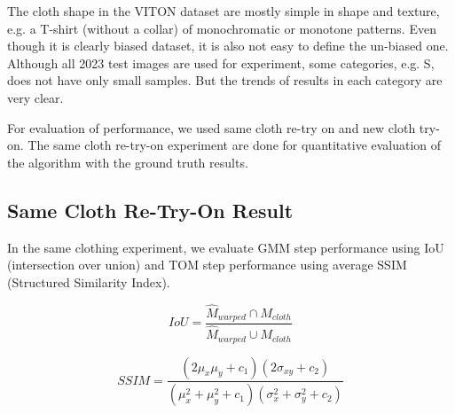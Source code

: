 The cloth shape in the VITON dataset are mostly simple in shape and texture, e.g. a T-shirt (without a collar) of  monochromatic or monotone patterns. Even though it is clearly biased dataset, it is also not easy to define the un-biased one. Although all 2023 test images are used for experiment, some categories, e.g. S, does not have only small samples. But the trends of results in each category are very clear. 


For evaluation of performance, we used same cloth re-try on and new cloth try-on. 
The same cloth re-try-on experiment are done for quantitative evaluation of the algorithm with the ground truth results. 

\subsection{Same Cloth Re-Try-On Result} 

In the same clothing experiment, we evaluate GMM step performance using IoU (intersection over union) and TOM step performance using average SSIM (Structured Similarity Index).

\begin{equation}
 IoU = \frac{ \hat{M}_{warped} \cap M_{cloth}}
            { \hat{M}_{warped} \cup M_{cloth}}
\end{equation} 


\begin{equation}
 SSIM = \frac{ ( 2 \mu_x \mu_y + c_1 )(2 \sigma_{xy} + c_2) }
             { ( \mu^2_x + \mu^2_y +c_1) ( \sigma^2_x + \sigma^2_y + c_2)}
 \end{equation} 

